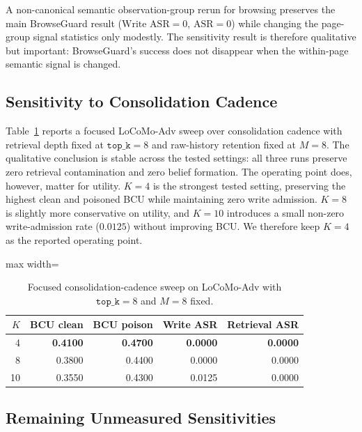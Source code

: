 \documentclass{article}
\begin{document}
A non-canonical semantic observation-group rerun for browsing preserves the main BrowseGuard result (\(\text{Write ASR}=0\), \(\text{ASR}=0\)) while changing the page-group signal statistics only modestly. The sensitivity result is therefore qualitative but important: BrowseGuard's success does not disappear when the within-page semantic signal is changed.

\subsection{Sensitivity to Consolidation Cadence}

Table~\ref{tab:appendix-k-sweep} reports a focused LoCoMo-Adv sweep over consolidation cadence with retrieval depth fixed at \(\texttt{top\_k}=8\) and raw-history retention fixed at \(M=8\). The qualitative conclusion is stable across the tested settings: all three runs preserve zero retrieval contamination and zero belief formation. The operating point does, however, matter for utility. \(K=4\) is the strongest tested setting, preserving the highest clean and poisoned BCU while maintaining zero write admission. \(K=8\) is slightly more conservative on utility, and \(K=10\) introduces a small non-zero write-admission rate (\(0.0125\)) without improving BCU. We therefore keep \(K=4\) as the reported operating point.

\begin{table}[tbp]
\centering
\caption{Focused consolidation-cadence sweep on LoCoMo-Adv with \(\texttt{top\_k}=8\) and \(M=8\) fixed.}
\label{tab:appendix-k-sweep}
\footnotesize
\setlength{\tabcolsep}{4.2pt}
\renewcommand{\arraystretch}{0.96}
\begin{adjustbox}{max width=\linewidth}
\begin{tabular}{rrrrr}
\toprule
\(K\) & BCU clean & BCU poison & Write ASR & Retrieval ASR \\
\midrule
4 & \textbf{0.4100} & \textbf{0.4700} & \textbf{0.0000} & \textbf{0.0000} \\
8 & 0.3800 & 0.4400 & 0.0000 & 0.0000 \\
10 & 0.3550 & 0.4300 & 0.0125 & 0.0000 \\
\bottomrule
\end{tabular}
\end{adjustbox}
\end{table}

\subsection{Remaining Unmeasured Sensitivities}
\end{document}

